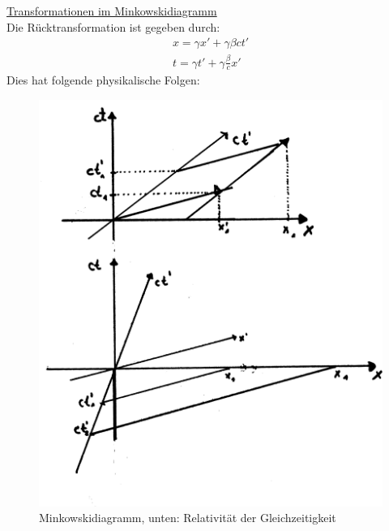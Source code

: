 \vspace{1.5cm}
\underline{Transformationen im Minkowskidiagramm}\\
Die  Rücktransformation ist gegeben durch:
\begin{eqnarray*}
x = \gamma x' + \gamma \beta c t'\\
t = \gamma t' + \gamma \frac{\beta}  c x'
\end{eqnarray*}
Dies hat folgende physikalische Folgen:\\
\begin{figure}
\begin{center}
	\includegraphics[scale=0.10]{Figs/Pim00012.png}
\caption{Minkowskidiagramm, unten: Relativität der Gleichzeitigkeit}
\end{center}
\end{figure}

